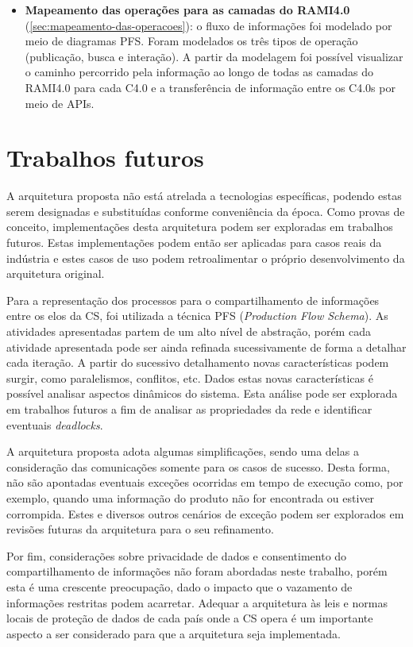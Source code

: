 \begin{itemize}
  \item \textbf{Mapeamento das operações para as camadas do RAMI4.0} (\autoref{sec:mapeamento-das-operacoes}): o fluxo de informações foi modelado por meio de diagramas PFS. Foram modelados os três tipos de operação (publicação, busca e interação). A partir da modelagem foi possível visualizar o caminho percorrido pela informação ao longo de todas as camadas do RAMI4.0 para cada C4.0 e a transferência de informação entre os C4.0s por meio de APIs.
\end{itemize}

\section{Trabalhos futuros}

A arquitetura proposta não está atrelada a tecnologias específicas, podendo estas serem designadas e substituídas conforme conveniência da época. Como provas de conceito, implementações desta arquitetura podem ser exploradas em trabalhos futuros. Estas implementações podem então ser aplicadas para casos reais da indústria e estes casos de uso podem retroalimentar o próprio desenvolvimento da arquitetura original.

Para a representação dos processos para o compartilhamento de informações entre os elos da CS, foi utilizada a técnica PFS (\textit{Production Flow Schema}). As atividades apresentadas partem de um alto nível de abstração, porém cada atividade apresentada pode ser ainda refinada sucessivamente de forma a detalhar cada iteração. A partir do sucessivo detalhamento novas características podem surgir, como paralelismos, conflitos, etc. Dados estas novas características é possível analisar aspectos dinâmicos do sistema. Esta análise pode ser explorada em trabalhos futuros a fim de analisar as propriedades da rede e identificar eventuais \textit{deadlocks}.

A arquitetura proposta adota algumas simplificações, sendo uma delas a consideração das comunicações somente para os casos de sucesso. Desta forma, não são apontadas eventuais exceções ocorridas em tempo de execução como, por exemplo, quando uma informação do produto não for encontrada ou estiver corrompida. Estes e diversos outros cenários de exceção podem ser explorados em revisões futuras da arquitetura para o seu refinamento.

Por fim, considerações sobre privacidade de dados e consentimento do compartilhamento de informações não foram abordadas neste trabalho, porém esta é uma crescente preocupação, dado o impacto que o vazamento de informações restritas podem acarretar. Adequar a arquitetura às leis e normas locais de proteção de dados de cada país onde a CS opera é um importante aspecto a ser considerado para que a arquitetura seja implementada.
